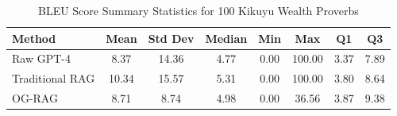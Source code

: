 \begin{table}[htbp]
\caption{BLEU Score Summary Statistics for 100 Kikuyu Wealth Proverbs}
\label{tab:bleu_summary}
\begin{tabular}{l|ccccccc}
\toprule
Method & Mean & Std Dev & Median & Min & Max & Q1 & Q3 \\
\midrule
Raw GPT-4 & 8.37 & 14.36 & 4.77 & 0.00 & 100.00 & 3.37 & 7.89 \\
Traditional RAG & 10.34 & 15.57 & 5.31 & 0.00 & 100.00 & 3.80 & 8.64 \\
OG-RAG & 8.71 & 8.74 & 4.98 & 0.00 & 36.56 & 3.87 & 9.38 \\
\bottomrule
\end{tabular}
\end{table}
